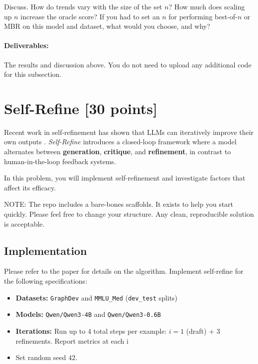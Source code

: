 \documentclass{article}
\begin{document}
Discuss. How do trends vary with the size of the set $n$? How much does scaling up $n$ increase the oracle score? If you had to set an $n$ for performing best-of-$n$ or MBR on this model and dataset, what would you choose, and why?
\begin{solve}
    
\end{solve}

\paragraph{Deliverables:} The results and discussion above. You do not need to upload any additional code for this subsection.


\section{Self-Refine [30 points]}

Recent work in self-refinement has shown that LLMs can iteratively improve their own outputs \cite{madaan2023selfrefineiterativerefinementselffeedback}. 
\emph{Self-Refine} introduces a closed-loop framework where a model alternates between 
\textbf{generation}, \textbf{critique}, and \textbf{refinement}, 
in contrast to human-in-the-loop feedback systems. 

In this problem, you will implement self-refinement and investigate factors that affect its efficacy.

NOTE: The repo includes a bare-bones scaffolds. It exists to help you start quickly. Please feel free to change your structure. Any clean, reproducible solution is acceptable.

\subsection{Implementation}
Please refer to the paper for details on the algorithm. Implement self-refine for the following specifications:
\begin{itemize}
    \item \textbf{Datasets:} \texttt{GraphDev} and \texttt{MMLU\_Med} (\texttt{dev\_test} splits)
    \item \textbf{Models:} \texttt{Qwen/Qwen3-4B} and \texttt{Qwen/Qwen3-0.6B}
    \item \textbf{Iterations:} Run up to 4 total steps per example: $i=1$ (draft) + 3 refinements. Report metrics at each i
    \item Set random seed $42$.
\end{itemize}
\end{document}
